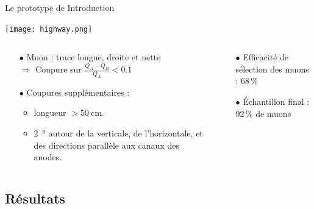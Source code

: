     \begin{frame}{Le prototype de \TOO{}}{Introduction}
        \begin{scriptsize}
        \texttt{[image: highway.png]}
        \begin{columns}
            \begin{column}{0.5\textwidth}
                \begin{itemize}
                    \item[$\bullet$] Muon : trace longue, droite et nette \\ $\Rightarrow$ Coupure sur $\frac{Q_A-Q_B}{Q_A} < 0.1$
                    \item[$\bullet$] Coupures supplémentaires : \begin{itemize}\item longueur $>\SI{50}{\centi\meter}$. \item \SI{2}{\degree} autour de la verticale, de l'horizontale, et des directions parallèle aux canaux des anodes.\end{itemize}
                \end{itemize}
            \end{column}
            \begin{column}{0.5\textwidth}
                \begin{itemize}
                    \item[$\bullet$] Efficacité de sélection des muons : 68\,\%
                    \item[$\bullet$] Échantillon final : 92\,\% de muons
                \end{itemize}
            \end{column}
        \end{columns}
        \end{scriptsize}
    \end{frame}
    
    \subsection{Résultats}


